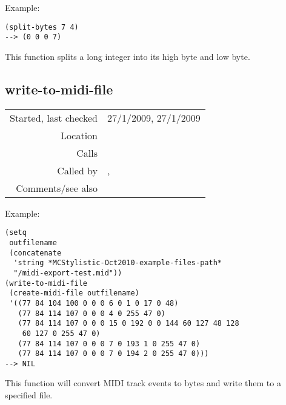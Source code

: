 \vspace{0.5cm}
\noindent Example:
\begin{verbatim}
(split-bytes 7 4)
--> (0 0 0 7)
\end{verbatim}

\noindent This function splits a long integer into its
high byte and low byte.


\subsection*{write-to-midi-file}\label{fun:write-to-midi-file}

\vspace{0.3cm}
\begin{tabular}{r|p{8cm}}
Started, last checked & 27/1/2009, 27/1/2009 \\
Location & \nameref{sec:MIDI-export} \\
Calls & \\
Called by & \nameref{fun:save-as-midi}, \nameref{fun:saveit} \\
Comments/see also &
\end{tabular}

\vspace{0.5cm}
\noindent Example:
\begin{verbatim}
(setq
 outfilename
 (concatenate
  'string *MCStylistic-Oct2010-example-files-path*
  "/midi-export-test.mid"))
(write-to-midi-file
 (create-midi-file outfilename)
 '((77 84 104 100 0 0 0 6 0 1 0 17 0 48) 
   (77 84 114 107 0 0 0 4 0 255 47 0)
   (77 84 114 107 0 0 0 15 0 192 0 0 144 60 127 48 128
    60 127 0 255 47 0) 
   (77 84 114 107 0 0 0 7 0 193 1 0 255 47 0)
   (77 84 114 107 0 0 0 7 0 194 2 0 255 47 0)))
--> NIL
\end{verbatim}

\noindent This function will convert MIDI track events
to bytes and write them to a specified file.














